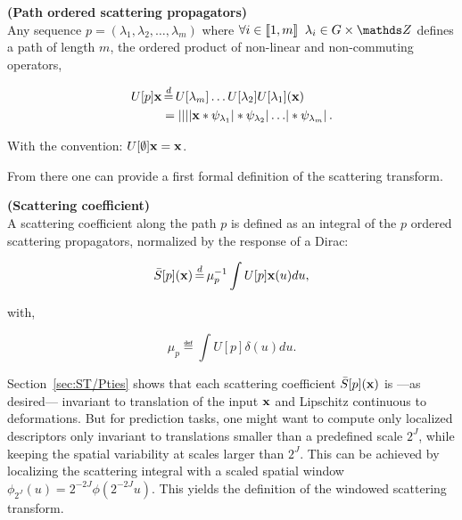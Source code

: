 \documentclass[a4paper,11pt]{report}
\begin{document}
			\begin{defn} \textbf{(Path ordered scattering propagators)}\\ 
				Any sequence $p = (\lambda_{1}, \lambda_{2},\dots ,\lambda_{m})$ where $\forall i \in \llbracket 1,m \rrbracket \;\; \lambda_{i} \in G \times \dsZ$ defines a path of length $m$, \ie the ordered product of non-linear and non-commuting operators,
				
				\begin{equation}
					\label{eq:path ordered SP}
					\begin{split}
						U[p]\bfx &\eqdef U[\lambda_{m}]\dots U[\lambda_{2}]U[\lambda_{1}](\bfx) \\
							&= \abs{\abs{\abs{\abs{\bfx \ast \psi_{\lambda_{1}}} \ast \psi_{\lambda_{2}}} 
							\dots } \ast \psi_{\lambda_{m}}}.   
					\end{split}
				\end{equation}
				
				With the convention: $U[\emptyset]{\bf x} = {\bf x}$.\\
				\label{def:path ordered SO}
      \end{defn} 
      
      From there one can provide a first formal definition of the scattering transform.
      
      \begin{defn} \textbf{(Scattering coefficient)}\\
				A scattering coefficient along the path $p$ is defined as an integral of the $p$ ordered scattering propagators, normalized by the response of a Dirac:

				\begin{equation}
					\label{eq:ST1}
					\bar{S}[p](\bfx) \eqdef \mu_{p}^{-1} \int U[p]\bfx(u) du,
				\end{equation}
				
				with,
				
				\begin{equation*}
					\label{eq:ST normalization}
					\mu_{p} \eqdef \int U[p]\delta(u)du.      
				\end{equation*}
				\label{def:SC}
      \end{defn}
      
      Section~\ref{sec:ST/Pties} shows that each scattering coefficient $\bar{S}[p]({\bf x})$ is ---as desired--- invariant to translation of the input ${\bf x}$ and Lipschitz continuous to deformations. But for prediction tasks, one might want to compute only localized descriptors only invariant to translations smaller than a predefined scale $2^{J}$, while keeping the spatial variability at scales larger than $2^{J}$. This can be achieved by localizing the scattering integral with a scaled spatial window $\phi_{2^{J}}(u) = 2^{-2J} \phi(2^{-2J}u)$. This yields the definition of the windowed scattering transform.
      
\end{document}
